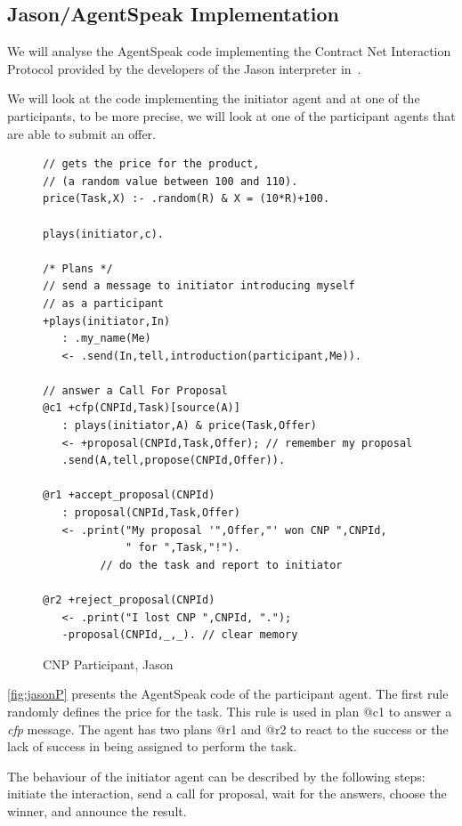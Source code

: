 \documentclass[a4paper,12pt,oneside,fleqn]{book} %
\begin{document}
\subsection{Jason/AgentSpeak Implementation} %
We will analyse the AgentSpeak code implementing the Contract Net
Interaction Protocol provided by the developers of the Jason interpreter
in~\cite{bordini2007programming}.

We will look at the code implementing the initiator agent and at one of the
participants, to be more precise, we will look at one of the participant agents
that are able to submit an offer.

\begin{figure}\footnotesize %
\begin{verbatim}
// gets the price for the product,
// (a random value between 100 and 110).
price(Task,X) :- .random(R) & X = (10*R)+100.

plays(initiator,c).

/* Plans */
// send a message to initiator introducing myself
// as a participant
+plays(initiator,In)
   : .my_name(Me)
   <- .send(In,tell,introduction(participant,Me)).

// answer a Call For Proposal
@c1 +cfp(CNPId,Task)[source(A)]
   : plays(initiator,A) & price(Task,Offer)
   <- +proposal(CNPId,Task,Offer); // remember my proposal
   .send(A,tell,propose(CNPId,Offer)).

@r1 +accept_proposal(CNPId)
   : proposal(CNPId,Task,Offer)
   <- .print("My proposal '",Offer,"' won CNP ",CNPId,
             " for ",Task,"!").
         // do the task and report to initiator

@r2 +reject_proposal(CNPId)
   <- .print("I lost CNP ",CNPId, ".");
   -proposal(CNPId,_,_). // clear memory

\end{verbatim}
\caption{CNP Participant, Jason}
\label{fig:jasonP}
\end{figure} %

\autoref{fig:jasonP} presents the AgentSpeak code of the participant agent.
The first rule randomly defines the price for the task. This rule is used
in plan @c1 to answer a \textit{cfp} message. The agent has two plans @r1
and @r2 to react to the success or the lack of success in being assigned to
perform the task.


The behaviour of the initiator agent can be described by the following
steps: initiate the interaction, send a call for proposal, wait for the
answers, choose the winner, and announce the result. 
\end{document}
